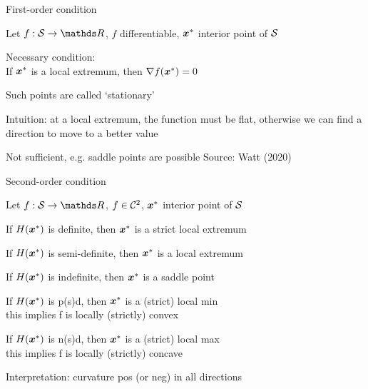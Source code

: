 \documentclass[11pt,compress,t,notes=noshow, xcolor=table]{beamer}
\begin{document}

\begin{framei}{First-order condition}
\item Let $f: \S \to \R$, $f$ differentiable, $\xvs$ interior point of $\S$
\item Necessary condition:\\
If $\xvs$ is a local extremum, then $\nabla \fxvs = 0$
\item Such points are called `stationary'
\item Intuition: at a local extremum, the function must be flat, otherwise we can find a direction to move to a better value
\item Not sufficient, e.g. saddle points are possible
\vfill
{}
Source: Watt (2020)
\end{framei}

\begin{framei}[fs=footnotesize]{Second-order condition}
\item Let $f: \S \to \R$, $f \in \CC{2}$, $\xvs$ interior point of $\S$
\item If $H(\xvs)$ is definite, then $\xvs$ is a strict local extremum
\item If $H(\xvs)$ is semi-definite, then $\xvs$ is a local extremum
\item If $H(\xvs)$ is indefinite, then $\xvs$ is a saddle point
\item If $H(\xvs)$ is p(s)d, then $\xvs$ is a (strict) local min\\
this implies f is locally (strictly) convex
\item If $H(\xvs)$ is n(s)d, then $\xvs$ is a (strict) local max\\
this implies f is locally (strictly) concave
\item Interpretation: curvature pos (or neg) in all directions


\end{framei}
\end{document}
